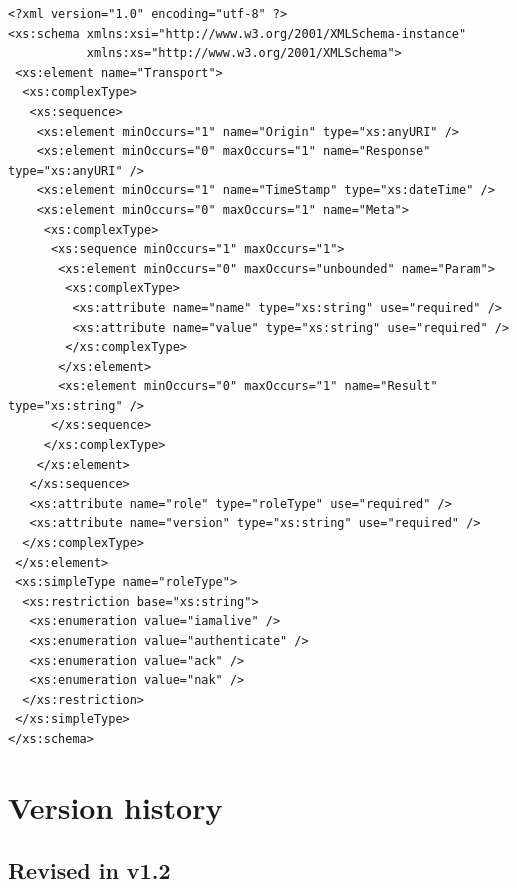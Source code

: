 \documentclass[a4paper,11pt]{ivoa}
\begin{document}
\begin{verbatim}
<?xml version="1.0" encoding="utf-8" ?>
<xs:schema xmlns:xsi="http://www.w3.org/2001/XMLSchema-instance"
           xmlns:xs="http://www.w3.org/2001/XMLSchema">
 <xs:element name="Transport">
  <xs:complexType>
   <xs:sequence>
    <xs:element minOccurs="1" name="Origin" type="xs:anyURI" />
    <xs:element minOccurs="0" maxOccurs="1" name="Response" type="xs:anyURI" />
    <xs:element minOccurs="1" name="TimeStamp" type="xs:dateTime" />
    <xs:element minOccurs="0" maxOccurs="1" name="Meta">
     <xs:complexType>
      <xs:sequence minOccurs="1" maxOccurs="1">
       <xs:element minOccurs="0" maxOccurs="unbounded" name="Param">
        <xs:complexType>
         <xs:attribute name="name" type="xs:string" use="required" />
         <xs:attribute name="value" type="xs:string" use="required" />
        </xs:complexType>
       </xs:element>
       <xs:element minOccurs="0" maxOccurs="1" name="Result" type="xs:string" />
      </xs:sequence>
     </xs:complexType>
    </xs:element>
   </xs:sequence>
   <xs:attribute name="role" type="roleType" use="required" />
   <xs:attribute name="version" type="xs:string" use="required" />
  </xs:complexType>
 </xs:element>
 <xs:simpleType name="roleType">
  <xs:restriction base="xs:string">
   <xs:enumeration value="iamalive" />
   <xs:enumeration value="authenticate" />
   <xs:enumeration value="ack" />
   <xs:enumeration value="nak" />
  </xs:restriction>
 </xs:simpleType>
</xs:schema>
\end{verbatim}

\section{Version history}

\subsection{Revised in v1.2}
\end{document}
